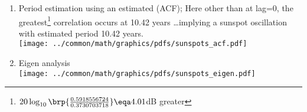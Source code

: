 \begin{example}
\begin{enumerate}
\item Period estimation using an estimated  (ACF);
Here other than at lag=0, the greatest\footnote{$20\log_{10}\brp{\frac{0.5918556724}{0.3730703718}}\eqa4.01$dB greater}
 correlation occurs at 10.42 years \ldots implying a sunspot oscillation with estimated period 10.42 years.
\\\texttt{[image: ../common/math/graphics/pdfs/sunspots\_acf.pdf]}

\item Eigen analysis
\\\texttt{[image: ../common/math/graphics/pdfs/sunspots\_eigen.pdf]}
\end{enumerate}
\end{example}

